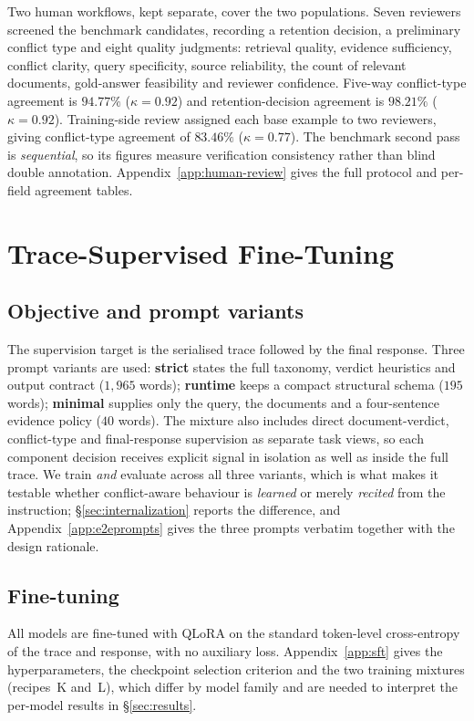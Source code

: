 Two human workflows, kept separate, cover the two populations. Seven reviewers
screened the benchmark candidates, recording a retention decision, a preliminary
conflict type and eight quality judgments: retrieval quality, evidence
sufficiency, conflict clarity, query specificity, source reliability, the count
of relevant documents, gold-answer feasibility and reviewer confidence. Five-way
conflict-type agreement is $94.77\%$ ($\kappa=0.92$) and retention-decision
agreement is $98.21\%$ ($\kappa=0.92$). Training-side review assigned each base
example to two reviewers, giving conflict-type agreement of $83.46\%$
($\kappa=0.77$). The benchmark second pass is \emph{sequential}, so its figures
measure verification consistency rather than blind double annotation.
Appendix~\ref{app:human-review} gives the full protocol and per-field agreement
tables.

\section{Trace-Supervised Fine-Tuning}
\label{sec:sft}

\subsection{Objective and prompt variants}

The supervision target is the serialised trace followed by the final response.
Three prompt variants are used: \textbf{strict} states the full taxonomy, verdict
heuristics and output contract ($1{,}965$ words); \textbf{runtime} keeps a
compact structural schema ($195$ words); \textbf{minimal} supplies only the
query, the documents and a four-sentence evidence policy ($40$ words). The
mixture also includes direct document-verdict, conflict-type and final-response
supervision as separate task views, so each component decision receives explicit
signal in isolation as well as inside the full trace. We train \emph{and}
evaluate across all three variants, which is what makes it testable whether
conflict-aware behaviour is \emph{learned} or merely \emph{recited} from the
instruction; \S\ref{sec:internalization} reports the difference, and
Appendix~\ref{app:e2eprompts} gives the three prompts verbatim together with the
design rationale.

\subsection{Fine-tuning}
All models are fine-tuned with QLoRA
\citep{dettmers2023qloraefficientfinetuningquantized,hu2021loralowrankadaptationlarge}
on the standard token-level cross-entropy of the trace and response, with no
auxiliary loss. Appendix~\ref{app:sft} gives the hyperparameters, the checkpoint
selection criterion and the two training mixtures (recipes~K and~L), which differ
by model family and are needed to interpret the per-model results in
\S\ref{sec:results}.

